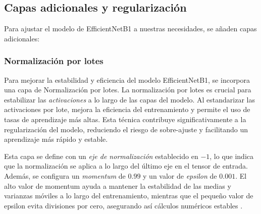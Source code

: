   
   
   
   
   \subsection{Capas adicionales y regularización}
   
   Para ajustar el modelo de EfficientNetB1 a nuestras necesidades, se añaden capas adicionales:
   
   \subsubsection{Normalización por lotes}
   
   Para mejorar la estabilidad y eficiencia del modelo EfficientNetB1, se incorpora una capa de Normalización por lotes. La normalización por lotes es crucial para estabilizar las \textit{activaciones} a lo largo de las capas del modelo. Al estandarizar las activaciones por lote, mejora la eficiencia del entrenamiento y permite el uso de tasas de aprendizaje más altas. Esta técnica contribuye significativamente a la regularización del modelo, reduciendo el riesgo de sobre-ajuste y facilitando un aprendizaje más rápido y estable.
   
   Esta capa se define con un \textit{eje de normalización} establecido en $-1$, lo que indica que la normalización se aplica a lo largo del último eje en el tensor de entrada. Además, se configura un \textit{momentum} de $0.99$ y un valor de \textit{epsilon} de $0.001$. El alto valor de momentum ayuda a mantener la estabilidad de las medias y varianzas móviles a lo largo del entrenamiento, mientras que el pequeño valor de epsilon evita divisiones por cero, asegurando así cálculos numéricos estables .
   

